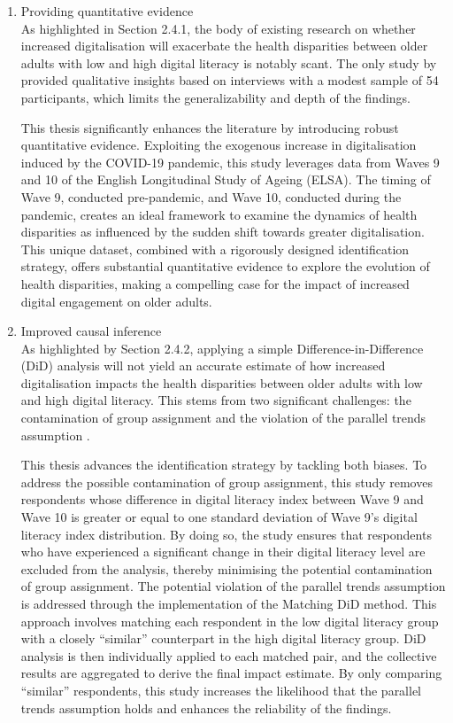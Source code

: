 \begin{enumerate}[wide=0pt, leftmargin=*, labelwidth=0pt, labelindent=\parindent, itemindent=0pt]
    \item Providing quantitative evidence \\
    As highlighted in Section 2.4.1, the body of existing research on whether increased digitalisation will exacerbate the health disparities between older adults with low and high digital literacy is notably scant. The only study by \textcite{alkureishi_digitally_2021} provided qualitative insights based on interviews with a modest sample of 54 participants, which limits the generalizability and depth of the findings.

    This thesis significantly enhances the literature by introducing robust quantitative evidence. Exploiting the exogenous increase in digitalisation induced by the COVID-19 pandemic, this study leverages data from Waves 9 and 10 of the English Longitudinal Study of Ageing (ELSA). The timing of Wave 9, conducted pre-pandemic, and Wave 10, conducted during the pandemic, creates an ideal framework to examine the dynamics of health disparities as influenced by the sudden shift towards greater digitalisation. This unique dataset, combined with a rigorously designed identification strategy, offers substantial quantitative evidence to explore the evolution of health disparities, making a compelling case for the impact of increased digital engagement on older adults.

    \item Improved causal inference \\
    As highlighted by Section 2.4.2, applying a simple Difference-in-Difference (DiD) analysis will not yield an accurate estimate of how increased digitalisation impacts the health disparities between older adults with low and high digital literacy. This stems from two significant challenges: the contamination of group assignment and the violation of the parallel trends assumption \parencite{chetty_bridging_2018,hall_digital_2015}.

    This thesis advances the identification strategy by tackling both biases. To address the possible contamination of group assignment, this study removes respondents whose difference in digital literacy index between Wave 9 and Wave 10 is greater or equal to one standard deviation of Wave 9's digital literacy index distribution. By doing so, the study ensures that respondents who have experienced a significant change in their digital literacy level are excluded from the analysis, thereby minimising the potential contamination of group assignment. The potential violation of the parallel trends assumption is addressed through the implementation of the Matching DiD method. This approach involves matching each respondent in the low digital literacy group with a closely ``similar” counterpart in the high digital literacy group. DiD analysis is then individually applied to each matched pair, and the collective results are aggregated to derive the final impact estimate. By only comparing ``similar” respondents, this study increases the likelihood that the parallel trends assumption holds and enhances the reliability of the findings. 
\end{enumerate}

